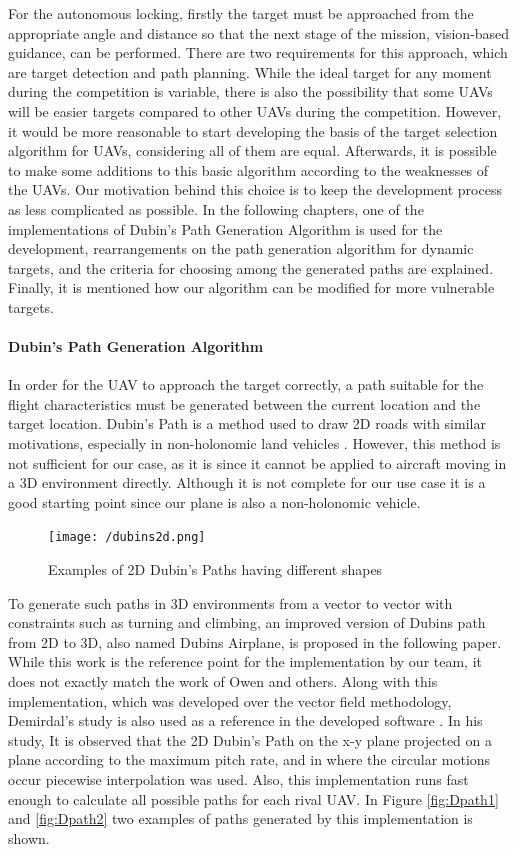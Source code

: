 \documentclass[12pt]{article}
\begin{document}
\justify For the autonomous locking, firstly the target must be approached from the appropriate angle and distance so that the next stage of the mission, vision-based guidance, can be performed. There are two requirements for this approach, which are target detection and path planning. While the ideal target for any moment during the competition is variable, there is also the possibility that some UAVs will be easier targets compared to other UAVs during the competition. However, it would be more reasonable to start developing the basis of the target selection algorithm for UAVs, considering all of them are equal. Afterwards, it is possible to make some additions to this basic algorithm according to the weaknesses of the UAVs. Our motivation behind this choice is to keep the development process as less complicated as possible.
\justify In the following chapters, one of the implementations of Dubin's Path Generation Algorithm is used for the development, rearrangements on the path generation algorithm for dynamic targets, and the criteria for choosing among the generated paths are explained. Finally, it is mentioned how our algorithm can be modified for more vulnerable targets.

\paragraph{Dubin’s Path Generation Algorithm}
In order for the UAV to approach the target correctly, a path suitable for the flight characteristics must be generated between the current location and the target location. Dubin's Path is a method used to draw 2D roads with similar motivations, especially in non-holonomic land vehicles \cite{Reeds1990OPTIMALPF}. However, this method is not sufficient for our case, as it is since it cannot be applied to aircraft moving in a 3D environment directly. Although it is not complete for our use case it is a good starting point since our plane is also a non-holonomic vehicle.
\begin{figure}[ht]
 	\centering
 	\texttt{[image: /dubins2d.png]}
 	\caption{Examples of 2D Dubin’s Paths having different shapes \cite{inproceedings}}
        \label{fig:moment}
 \end{figure}
\FloatBarrier

\justify
To generate such paths in 3D environments from a vector to vector with constraints such as turning and climbing, an improved version of Dubins path from 2D to 3D, also named Dubins Airplane, is proposed in the following paper\cite{s20020547}. While this work is the reference point for the implementation by our team, it does not exactly match the work of Owen and others. Along with this implementation, which was developed over the vector field methodology, Demirdal's study is also used as a reference in the developed software \cite{Tolga2022}. In his study, It is observed that the 2D Dubin’s Path on the x-y plane projected on a plane according to the maximum pitch rate, and in where the circular motions occur piecewise interpolation was used. Also, this implementation runs fast enough to calculate all possible paths for each rival UAV. In Figure \ref{fig:Dpath1} and \ref{fig:Dpath2} two examples of paths generated by this implementation is shown.
\end{document}
